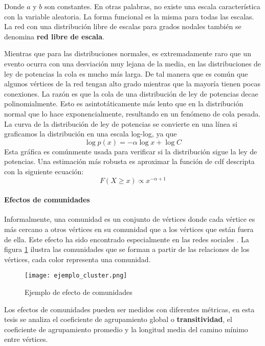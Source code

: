Donde $a$ y $b$ son constantes. En otras palabras, no existe una escala característica con la variable aleatoria. La forma funcional es la misma para todas las escalas. La red con una distribución libre de escalas para grados nodales también se denomina \textbf{red libre de escala}.
 
Mientras que para las distribuciones normales, es extremadamente raro que un evento ocurra con una desviación muy lejana de la media, en las distribuciones de ley de potencias la cola es mucho más larga. De tal manera que es común que algunos vértices de la red tengan alto grado mientras que la mayoría tienen pocas conexiones. La razón es que la cola de una distribución de ley de potencias decae polinomialmente. Esto es asintotáticamente más lento que en la distribución normal que lo hace exponencialmente, resultando en un fenómeno de cola pesada. La curva de la distribución de ley de potencias se convierte en una línea si graficamos la distribución en una escala log-log, ya que
\begin{equation}
\log p(x) =-\alpha \log x + \log C
\end{equation}
Esta gráfica es comúnmente usada para verificar si la distribución sigue la ley de potencias. Una estimación más robusta es aproximar la función de \acrfull{cdf} descripta con la siguiente ecuación:
\begin{equation}
F(X\geq x) \propto  x^{-\alpha+1 }
\end{equation}

\paragraph{Efectos de comunidades}
\label{par:efecto-comunidades}
Informalmente, una comunidad es un conjunto de vértices donde cada vértice es más cercano a otros vértices en su comunidad que a los vértices que están fuera de ella. Este efecto ha sido encontrado especialmente en las redes sociales \cite{Tang2010}. La figura \ref{fig:ejemploCluster} ilustra las comunidades que se forman a partir de las relaciones de los vértices, cada color representa una comunidad.

\begin{figure}
\caption{Ejemplo de efecto de comunidades}
\label{fig:ejemploCluster}
\centering
\texttt{[image: ejemplo\_cluster.png]}
\end{figure}

Los efectos de comunidades pueden ser medidos con diferentes métricas, en esta tesis se analiza el coeficiente de agrupamiento global o \textbf{transitividad}, el coeficiente de agrupamiento promedio y la longitud media del camino mínimo entre vértices. 

